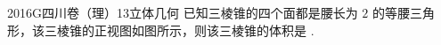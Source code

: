 
\begin{problem}{2016}{G}{四川卷（理）}{13}{立体几何}
已知三棱锥的四个面都是腰长为 $ 2 $ 的等腰三角形，该三棱锥的正视图如图所示，则该三棱锥的体积是 \underline{\hspace{4em}}.
\end{problem}

\begin{answer}

\end{answer}

\begin{solutions}

\end{solutions}